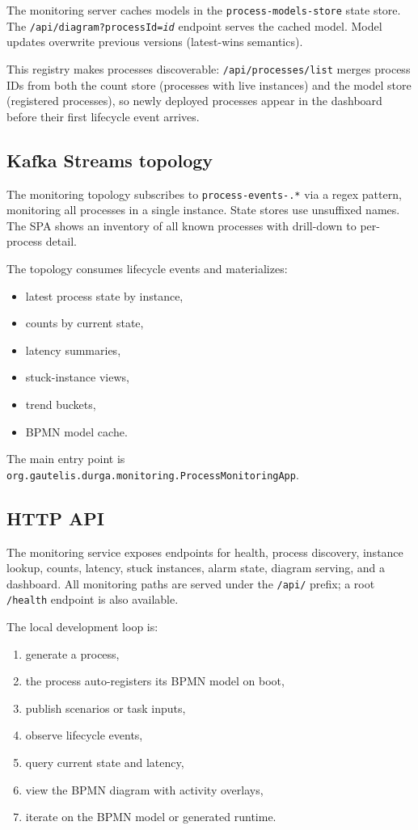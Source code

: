 The monitoring server caches models in the \texttt{process-models-store} state store. \\
The \texttt{/api/diagram?processId=\textit{id}} endpoint serves the cached model.
Model updates overwrite previous versions (latest-wins semantics).

This registry makes processes discoverable: \texttt{/api/processes/list} merges
process IDs from both the count store (processes with live instances) and the model
store (registered processes), so newly deployed processes appear in the dashboard
before their first lifecycle event arrives.

\subsection{Kafka Streams topology}

The monitoring topology subscribes to \texttt{process-events-.*} via a regex
pattern, monitoring all processes in a single instance. State stores use
unsuffixed names. The SPA shows an inventory of all known processes with
drill-down to per-process detail.

The topology consumes lifecycle events and materializes:
\begin{itemize}
\item latest process state by instance,
\item counts by current state,
\item latency summaries,
\item stuck-instance views,
\item trend buckets,
\item BPMN model cache.
\end{itemize}

The main entry point is \texttt{org.gautelis.durga.monitoring.ProcessMonitoringApp}.

\subsection{HTTP API}

The monitoring service exposes endpoints for health, process discovery, instance
lookup, counts, latency, stuck instances, alarm state, diagram serving, and a dashboard.
All monitoring paths are served under the \texttt{/api/} prefix; a root \texttt{/health} endpoint is also available.

The local development loop is:
\begin{enumerate}
\item generate a process,
\item the process auto-registers its BPMN model on boot,
\item publish scenarios or task inputs,
\item observe lifecycle events,
\item query current state and latency,
\item view the BPMN diagram with activity overlays,
\item iterate on the BPMN model or generated runtime.
\end{enumerate}

